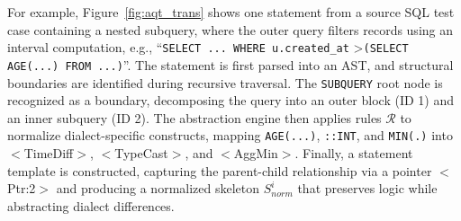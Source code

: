 \documentclass[conference]{IEEEtran}
\begin{document}
For example, Figure~\ref{fig:aqt_trans} shows one statement from a source SQL test case containing a nested subquery, where the outer query filters records using an interval computation, e.g., ``\texttt{SELECT ... WHERE u.created\_at} \textgreater \texttt{(SELECT AGE(...) FROM ...)}''.
The statement is first parsed into an AST, and structural boundaries are identified during recursive traversal. 
The \texttt{SUBQUERY} root node is recognized as a boundary, decomposing the query into an outer block (ID 1) and an inner subquery (ID 2).
The abstraction engine then applies rules $\mathcal{R}$ to normalize dialect-specific constructs, mapping \texttt{AGE(...)}, \texttt{::INT}, and \texttt{MIN(.)} into $<$TimeDiff$>$, $<$TypeCast$>$, and $<$AggMin$>$.
Finally, a statement template is constructed, capturing the parent-child relationship via a pointer $<$Ptr:2$>$ and producing a normalized skeleton $S^i_{norm}$ that preserves logic while abstracting dialect differences.
\end{document}
